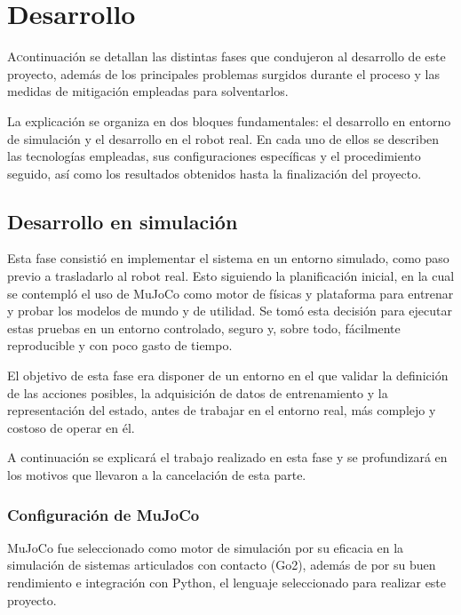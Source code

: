 \chapter{Desarrollo}
\label{chap:desarrollo}

\lettrine{A} continuación se detallan las distintas fases que condujeron al desarrollo de este proyecto, además de los principales problemas surgidos durante el proceso y las medidas 
de mitigación empleadas para solventarlos.


La explicación se organiza en dos bloques fundamentales: el desarrollo en entorno de simulación y el desarrollo en el robot real. En cada uno de ellos se describen las tecnologías 
empleadas, sus configuraciones específicas y el procedimiento seguido, así como los resultados obtenidos hasta la finalización del proyecto.


\section{Desarrollo en simulación}
\label{sec:desarrollo_simulacion}

Esta fase consistió en implementar el sistema en un entorno simulado, como paso previo a trasladarlo al robot real. Esto siguiendo la planificación inicial, en la cual se contempló el 
uso de MuJoCo como motor de físicas y plataforma para entrenar y probar los modelos de mundo y de utilidad. Se tomó esta decisión para ejecutar estas pruebas en un entorno controlado, 
seguro y, sobre todo, fácilmente reproducible y con poco gasto de tiempo. 

El objetivo de esta fase era disponer de un entorno en el que validar la definición de las acciones posibles, la adquisición de datos de entrenamiento y la representación del 
estado, antes de trabajar en el entorno real, más complejo y costoso de operar en él.

A continuación se explicará el trabajo realizado en esta fase y se profundizará en los motivos que llevaron a la cancelación de esta parte.

\subsection{Configuración de MuJoCo}
\label{sec:desarrollo_conf_mujoco}

MuJoCo fue seleccionado como motor de simulación por su eficacia en la simulación de sistemas articulados con contacto (Go2), además de por su buen rendimiento e integración con 
Python, el lenguaje seleccionado para realizar este proyecto.

